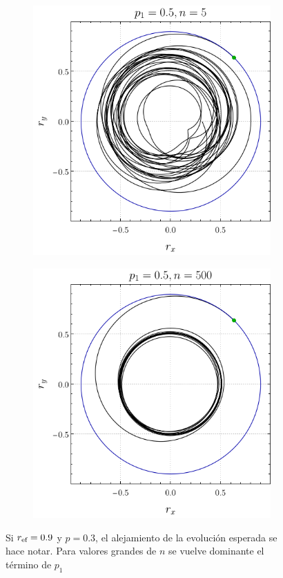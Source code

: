 \begin{figure}[ht!]
    \centering
    \begin{subfigure}{0.5\textwidth}
      \centering
      \includegraphics[width=0.9\linewidth]{chapter3/figures_separable/local_all_ran_p=0.5_r=0.9_n=5_a=-3_b=3.png}
    \end{subfigure}%
    \begin{subfigure}{0.5\textwidth}
      \centering
      \includegraphics[width=0.9\linewidth]{chapter3/figures_separable/local_all_ran_p=0.5_r=0.9_n=500_a=-3_b=3.png}
    \end{subfigure}
    \caption{Si $r_{\text{ef}}=0.9$ y $p=0.3$, el alejamiento de la evolución esperada se hace notar. Para valores grandes de $n$ se vuelve dominante el término de $p_{1}$}\label{fig:Oscilations13}
\end{figure}

\newpage

\pagebreak